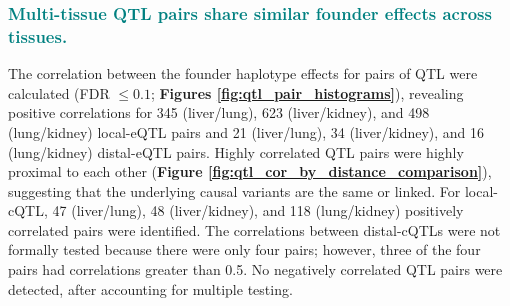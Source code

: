 \documentclass[9pt,twocolumn,twoside]{gsajnl}
\newcommand{\GKinline}[1]{\textcolor{teal}{#1}}
\begin{document}
\subsubsection{\GKinline{Multi-tissue QTL pairs share similar founder effects across tissues.}}
The correlation between the founder haplotype effects for pairs of QTL were calculated (FDR $\le 0.1$; \textbf{Figures \ref{fig:qtl_pair_histograms}}), revealing positive correlations for 345 (liver/lung), 623 (liver/kidney), and 498 (lung/kidney) local-eQTL pairs and 21 (liver/lung), 34 (liver/kidney), and 16 (lung/kidney) distal-eQTL pairs. Highly correlated QTL pairs were highly proximal to each other (\textbf{Figure \ref{fig:qtl_cor_by_distance_comparison}}), suggesting that the underlying causal variants are the same or linked. For local-cQTL, 47 (liver/lung), 48 (liver/kidney), and 118 (lung/kidney) positively correlated pairs were identified. The correlations between distal-cQTLs were not formally tested because there were only four pairs; however, three of the four pairs had correlations greater than 0.5. No negatively correlated QTL pairs were detected, after accounting for multiple testing.
\end{document}
